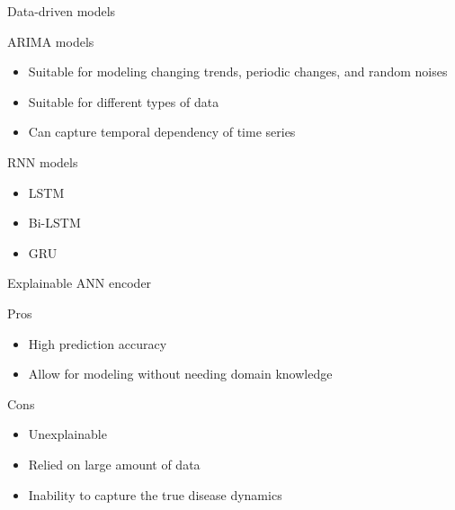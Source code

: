 \begin{frame}[allowframebreaks]{Data-driven models}

    \gls{ARIMA} models \cite{ceylanEstimationCOVID19Prevalence2020,singhPredictionCOVID19Pandemic2020,ribeiroShorttermForecastingCOVID192020}
    \begin{itemize}
        \item Suitable for modeling changing trends, periodic changes, and random noises
        \item Suitable for different types of data
        \item Can capture temporal dependency of time series
    \end{itemize}

    \framebreak

    \gls{RNN} models \cite{chimmulaTimeSeriesForecasting2020,shahidPredictionsCOVID19Deep2020}
    \begin{itemize}
        \item \gls{LSTM}
        \item \gls{Bi-LSTM}
        \item \gls{GRU}
    \end{itemize}

    Explainable \gls{ANN} encoder \cite{ramchandaniDeepCOVIDNetInterpretableDeep2020}

    \framebreak

    \begin{exampleblock}{Pros}
    \begin{itemize}
        \item High prediction accuracy
        \item Allow for modeling without needing domain knowledge
    \end{itemize}
    \end{exampleblock}

    \begin{alertblock}{Cons}
    \begin{itemize}
        \item Unexplainable
        \item Relied on large amount of data
        \item Inability to capture the true disease dynamics
    \end{itemize}
    \end{alertblock}

\end{frame}


